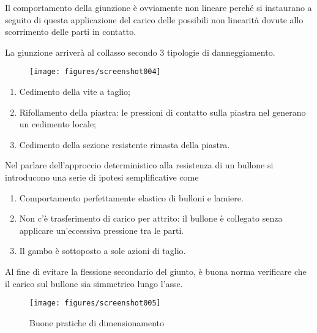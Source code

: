 \documentclass[a4paper, 15pt]{article}
\begin{document}
\begin{adjustwidth}{2in}{}
	 Il comportamento della giunzione è ovviamente non lineare perché si  instaurano a seguito di questa applicazione del carico delle possibili non linearità dovute allo scorrimento delle parti in contatto. 
	 
	 La giunzione arriverà al collasso secondo 3 tipologie di danneggiamento.
	 \begin{figure}[H]
	 	\centering
	 	\texttt{[image: figures/screenshot004]}
	 	\label{fig:screenshot004}
	 \end{figure}
	 \begin{enumerate}
	 	\item Cedimento della vite a taglio;
	 	\item Rifollamento della piastra: le pressioni di contatto sulla piastra nel generano un cedimento locale;
	 	\item Cedimento della sezione resistente rimasta della piastra. 
	 \end{enumerate}
	 Nel parlare dell'approccio deterministico alla resistenza di un bullone si introducono una serie di ipotesi semplificative come 
	 \begin{enumerate}
	 	\item Comportamento perfettamente elastico di bulloni e lamiere. 
	 	\item Non c'è trasferimento di carico per attrito: il bullone è collegato senza applicare un'eccessiva pressione tra le parti. 
	 	\item Il gambo è sottoposto a sole azioni di taglio.
	 \end{enumerate}
	 Al fine di evitare la flessione secondario del giunto, è buona norma verificare che il carico sul bullone sia simmetrico lungo l'asse. 
	 \begin{figure}[H]
	 	\centering
	 	\texttt{[image: figures/screenshot005]}
	 	\caption{Buone pratiche di dimensionamento}
	 	\label{fig:screenshot005}
	 \end{figure}
\end{adjustwidth}
\end{document}
